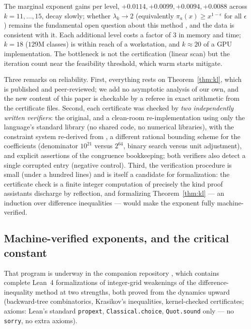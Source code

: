 \documentclass[11pt]{article}
\newcommand{\code}[1]{\texttt{#1}}
\begin{document}
The marginal exponent gains per level,
$+0.0114, +0.0099, +0.0094, +0.0088$ across $k = 11, \dots, 15$, decay
slowly; whether $\lambda_k \to 2$ (equivalently $\pi_a(x) \ge
x^{1-\epsilon}$ for all $\epsilon$) remains the fundamental open
question about this method \cite[\S6]{kl}, and the data is consistent
with it. Each additional level costs a factor of $3$ in memory and
time; $k = 18$ ($129$M classes) is within reach of a workstation, and
$k \approx 20$ of a GPU implementation. The bottleneck is not the
certification (linear scan) but the iteration count near the
feasibility threshold, which warm starts mitigate.

Three remarks on reliability. First, everything rests on
Theorem~\ref{thm:kl}, which is published and peer-reviewed; we add no
asymptotic analysis of our own, and the new content of this paper is
checkable by a referee in exact arithmetic from the certificate files.
Second, each certificate was checked by \emph{two independently
written verifiers}: the original, and a clean-room re-implementation
using only the language's standard library (no shared code, no
numerical libraries), with the constraint system re-derived from
\cite[\S2]{kl}, a different rational bounding scheme for the
coefficients (denominator $10^{21}$ versus $2^{64}$, binary search
versus unit adjustment), and explicit assertions of the congruence
bookkeeping; both verifiers also detect a single corrupted entry
(negative control). Third, the verification procedure is small (under
a hundred lines) and is itself a candidate for formalization: the
certificate check is a finite integer computation of precisely the
kind proof assistants discharge by reflection, and formalizing
Theorem~\ref{thm:kl} --- an induction over difference inequalities ---
would make the exponent fully machine-verified.

\subsection*{Machine-verified exponents, and the critical constant}

That program is underway in the companion repository \cite{companion},
which contains complete Lean~4 formalizations of integer-grid
weakenings of the difference-inequality method at two strengths, both
proved from the dynamics upward (backward-tree combinatorics,
Krasikov's inequalities, kernel-checked certificates; axioms: Lean's
standard \code{propext}, \code{Classical.choice}, \code{Quot.sound}
only --- no \code{sorry}, no extra axioms).
\end{document}
